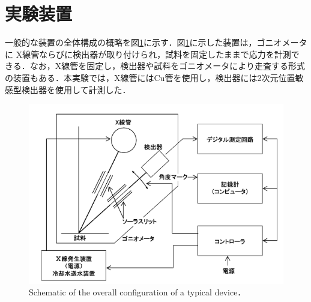 \section{実験装置}
一般的な装置の全体構成の概略を図\ref{fig:装置概略図}に示す．図\ref{fig:装置概略図}に示した装置は，ゴニオメータに X線管ならびに検出器が取り付けられ，試料を固定したままで応力を計測できる．なお，X線管を固定し，検出器や試料をゴニオメータにより走査する形式の装置もある．本実験では，X線管にはCu管を使用し，検出器には2次元位置敏感型検出器を使用して計測した．
\begin{figure}[htbp]
    \centering %
    \includegraphics[width=100truemm,clip]{fig/装置概略図.png}
    \caption{Schematic of the overall configuration of a typical device．}
    \label{fig:装置概略図}
\end{figure}